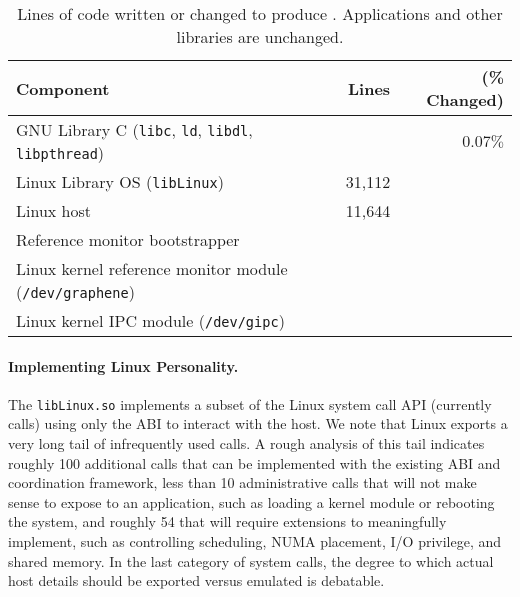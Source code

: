 \begin{table}[t!b!]
\footnotesize
\centering
\begin{tabular}{|l|rr|}
\hline
{\bf Component} & {\bf Lines} & ({\bf \% Changed})\\
\hline
GNU Library C ({\tt libc}, {\tt ld}, {\tt libdl}, {\tt libpthread}) & \libclines{} & $0.07\%$ \\
\hline
Linux Library OS ({\tt libLinux}) & 31,112 & \\
Linux host \pal{} & 11,644 & \\
\hline
Reference monitor bootstrapper & {} & \\
Linux kernel reference monitor module ({\tt /dev/graphene}) & \sandboxmodlines{} & \\
Linux kernel IPC module ({\tt /dev/gipc}) & \gipclines{} & \\
\hline
\end{tabular}
\caption[\sysname{}: lines of code written or changed]
{Lines of code written or changed to produce \sysname{}.  Applications and other libraries are unchanged.}
\label{tab:LoC}
\end{table}





\paragraph{Implementing Linux Personality.} 
The \sysname{} {\tt libLinux.so} implements a subset 
of the Linux system call API (currently \syscalls{} calls)
using only the \pal{} ABI to interact with the host.
We note that Linux exports a very long tail of infrequently used calls.
A rough analysis of this tail indicates roughly 100 additional calls that can be implemented
with the existing \pal{} ABI and coordination framework, less than 10 administrative calls that will not make sense to expose to 
an application, such as loading a kernel module or rebooting the system, and roughly 54 that will require 
\pal{} extensions to meaningfully implement, such as controlling scheduling,
NUMA placement, I/O privilege, and shared memory.
In the last category of system calls, the degree to which actual host details should be exported versus emulated is debatable.

